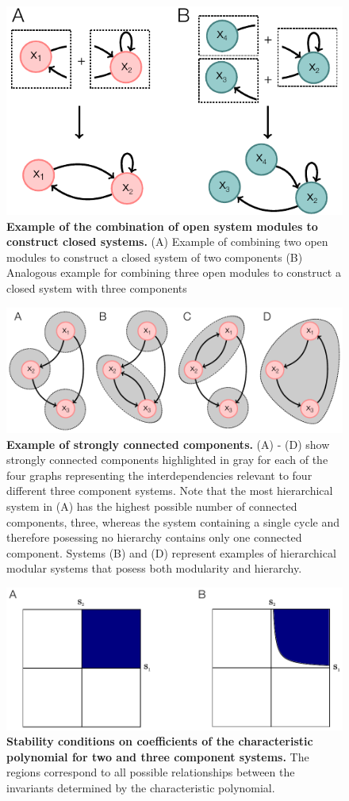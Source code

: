 \begin{figure}[!ht]
\centering
\noindent\includegraphics[width=0.6\columnwidth]{fig/examplesystemmodules.pdf}
\caption{{\bf Example of the combination of open system modules to construct closed systems.} (A) Example of combining two open modules to construct a closed system of two components (B) Analogous example for combining three open modules to construct a closed system with three components}
\label{fig:examplesystemmodules}
\end{figure}

\begin{figure}[!ht]
\centering
\noindent\includegraphics[width=0.7\columnwidth]{fig/scc.pdf}
\caption{{\bf Example of strongly connected components.} (A) - (D) show strongly connected components highlighted in gray for each of the four graphs representing the interdependencies relevant to four different three component systems. Note that the most hierarchical system in (A) has the highest possible number of connected components, three, whereas the system containing a single cycle and therefore posessing no hierarchy contains only one connected component. Systems (B) and (D) represent examples of hierarchical modular systems that posess both modularity and hierarchy.}
\label{fig:scc}
\end{figure}

\begin{figure}[!ht]
\centering
\noindent\includegraphics[width=0.5\columnwidth]{fig/region2and3.pdf}
\caption{{\bf Stability conditions on coefficients of the characteristic polynomial for two and three component systems.} The regions correspond to all possible relationships between the invariants determined by the characteristic polynomial.}
\label{fig:region2and3}
\end{figure}

